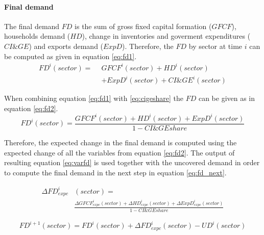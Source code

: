 \paragraph{Final demand}


The final demand $FD$ is the sum of gross fixed capital formation ($GFCF$), households demand ($HD$), change in inventories and goverment expenditures ($CI\&GE$) and exports demand ($ExpD$). Therefore, the $FD$ by sector at time $i$ can be computed as given in equation \eqref{eq:fd1}.
\begin{align}
FD^i(sector) =\hspace{5pt} &GFCF^i(sector)+HD^i(sector)\nonumber\\
               &+ExpD^i(sector)+CI\&GE^i(sector)\label{eq:fd1}
\end{align}

When combining equation \eqref{eq:fd1} with \eqref{eq:cigeshare} the $FD$ can be given as in equation \eqref{eq:fd2}.
\begin{equation}
FD^i(sector)=\frac{GFCF^i(sector)+HD^i(sector)+ExpD^i(sector)}{1-CI\&GEshare}
\label{eq:fd2}
\end{equation}

Therefore, the expected change in the final demand is computed using the expected change of all the variables from equation \eqref{eq:fd2}. The output of resulting equation \eqref{eq:varfd} is used together with the uncovered demand in order to compute the final demand in the next step in equation \eqref{eq:fd_next}.

\begin{align}
\Delta FD_{expc}^i&(sector)=\nonumber\\
&\frac{\Delta GFCF_{expc}^i(sector)+\Delta HD_{expc}^i(sector)+\Delta ExpD_{expc}^i(sector)}{1-CI\&GEshare}
\label{eq:varfd}
\end{align}

    \begin{equation}
    FD^{i+1}(sector)=FD^i(sector)+\Delta FD_{expc}^i(sector)-UD^i(sector)
    \label{eq:fd_next}
    \end{equation}
